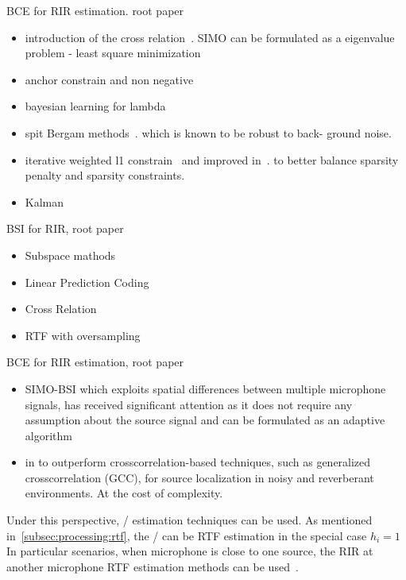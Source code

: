 BCE for RIR estimation. root paper 
\begin{itemize}
    \item introduction of the cross relation~. SIMO can be formulated as a eigenvalue problem - least square minimization
    \item anchor constrain and non negative~
    \item bayesian learning for lambda~
    \item spit Bergam methods~. which is known to be robust to back- ground noise.
    \item iterative weighted l1 constrain~ and improved in~.
    to better balance sparsity penalty and sparsity constraints.
    \item Kalman 
\end{itemize}

BSI for RIR, root paper ~
\begin{itemize}
    \item Subspace mathods
    \item Linear Prediction Coding
    \item Cross Relation
    \item RTF with oversampling~
\end{itemize}

BCE for RIR estimation, root paper 
\begin{itemize}
    \item SIMO-BSI which exploits spatial differences between multiple microphone signals, has received significant attention as it does not require any assumption about the source signal and can be formulated as an adaptive algorithm~
    \item in  to outperform crosscorrelation-based techniques, such as generalized crosscorrelation (GCC), for source localization in noisy and reverberant environments. At the cost of complexity.
\end{itemize}

Under this perspective, \RTF/ estimation techniques can be used.
As mentioned in~\cref{subsec:processing:rtf}, the \RTF/ can be
RTF estimation in the special case $h_i = 1$
In particular scenarios, when microphone is close to one source, the RIR at another microphone RTF estimation methods can be used~.

